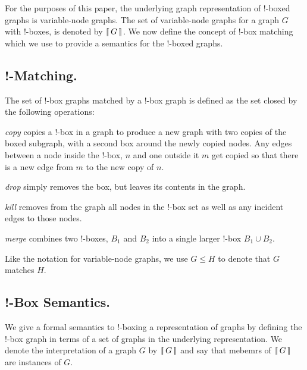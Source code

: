 \documentclass[runningheads]{llncs}
\newcommand{\binterp}[1]{\lceil\hspace{-0.27em}|\, #1\, |\hspace{-0.27em}\rceil}
\begin{document}
For the purposes of this paper, the underlying graph representation of
!-boxed graphs is variable-node graphs. The set of variable-node
graphs for a graph $G$ with !-boxes, is denoted by $\binterp{G}$. We
now define the concept of !-box matching which we use to provide a
semantics for the !-boxed graphs. 

\subsection{!-Matching.}

The set of !-box graphs matched by a !-box graph is defined as the set
closed by the following operations:

\begin{definition}
  \emph{copy} copies a !-box in a graph to produce a new graph with
  two copies of the boxed subgraph, with a second box around the newly
  copied nodes. Any edges between a node inside the !-box, $n$ and one
  outside it $m$ get copied so that there is a new edge from $m$ to
  the new copy of $n$.
\end{definition}

\begin{definition}
  \emph{drop} simply removes the box, but leaves its contents in the
  graph.
\end{definition}

\begin{definition}
  \emph{kill} removes from the graph all nodes in the !-box set as
  well as any incident edges to those nodes.
\end{definition}

\begin{definition}
  \emph{merge} combines two !-boxes, $B_1$ and $B_2$ into a single
  larger !-box $B_1 \cup B_2$.
\end{definition}

Like the notation for variable-node graphs, we use $G \leq H$ to
denote that $G$ matches $H$. 

\subsection{!-Box Semantics.} 

We give a formal semantics to !-boxing a representation of graphs by
defining the !-box graph in terms of a set of graphs in the
underlying representation. We denote the interpretation of a graph $G$
by $\binterp{G}$ and say that mebemrs of $\binterp{G}$ are instances
of $G$. 
\end{document}
